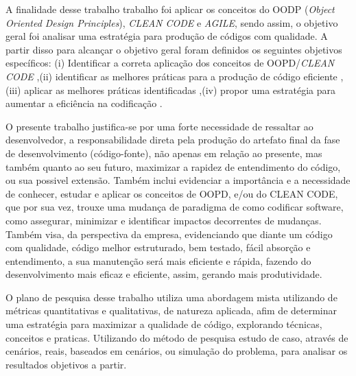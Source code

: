 \documentclass[12pt]{article}
\begin{document}
A finalidade desse trabalho trabalho foi aplicar os conceitos do OODP (\textit{Object Oriented Design Principles}), \textit{CLEAN CODE} e \textit{AGILE}, sendo assim, o objetivo geral foi analisar uma estratégia para produção de códigos com qualidade. A partir disso para alcançar o objetivo geral foram definidos os seguintes objetivos específicos: 
(i) Identificar a correta aplicação dos conceitos de OOPD/\textit{CLEAN CODE}
,(ii) identificar as melhores práticas para a produção de código eficiente
,(iii) aplicar as melhores práticas identificadas
,(iv) propor uma estratégia para aumentar a eficiência na codificação
.

O presente trabalho justifica-se por uma forte necessidade de ressaltar ao desenvolvedor, a responsabilidade direta pela produção do artefato final da fase de desenvolvimento (código-fonte)\cite{TR_CLEAN_CODE_IMPORTANCIA}, não apenas em relação ao presente, mas também quanto ao seu futuro, maximizar a rapidez de entendimento do código, ou sua possivel extensão. Também inclui evidenciar a importância e a necessidade de conhecer, estudar e aplicar os conceitos de OOPD, e/ou do CLEAN CODE, que por sua vez, trouxe uma mudança de paradigma de como codificar software, como assegurar, minimizar e identificar impactos decorrentes de mudanças\cite{CODE_SIMPLICITY}.
Também visa, da perspectiva da empresa, evidenciando que diante um código com qualidade, código melhor estruturado, bem testado, fácil absorção e entendimento, a sua manutenção será mais eficiente e rápida, fazendo do desenvolvimento mais eficaz e eficiente, assim, gerando mais produtividade.

O plano de pesquisa desse trabalho utiliza uma abordagem mista utilizando de métricas quantitativas e qualitativas, de natureza aplicada, afim de determinar uma estratégia para maximizar a qualidade de código, explorando técnicas, conceitos e praticas. Utilizando do método de pesquisa estudo de caso, através de cenários, reais, baseados em cenários, ou simulação do problema, para analisar os resultados objetivos a partir. 
\end{document}
